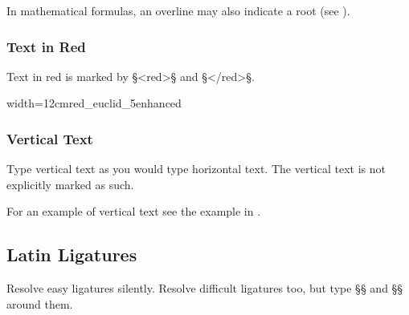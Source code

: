 \begin{crossref}
In mathematical formulas, an overline may also indicate a root (see ).
\end{crossref}


\subsubsection{Text in Red}
\label{section text in red}

\begin{mainruleLessImportant}
Text in red is marked by §<red>§ and §</red>§. 
\end{mainruleLessImportant}

\vspace{3mm}
\begin{sampleImageSmall}{width=12cm}{red_euclid_5enhanced}

\end{sampleImageSmall}

\subsubsection{Vertical Text}

\begin{mainrule}
Type vertical text as you would type horizontal text. The vertical text is not explicitly marked as such.
\end{mainrule}

\begin{crossref}
For an example of vertical text see the example in .
\end{crossref}


\tocspace
\subsection{Latin Ligatures}
\label{section latin ligatures}

\begin{mainrule}
Resolve easy ligatures silently. Resolve difficult ligatures too, but type §{§ and §}§ around them.
\end{mainrule}

